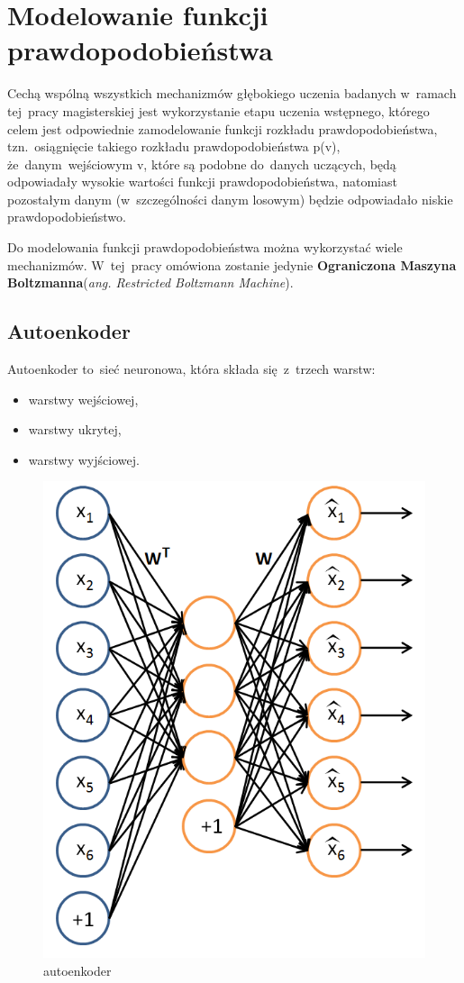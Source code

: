 \section{Modelowanie funkcji prawdopodobieństwa}
Cechą wspólną wszystkich mechanizmów głębokiego uczenia badanych w~ramach tej~pracy magisterskiej jest
wykorzystanie etapu uczenia wstępnego, którego celem jest odpowiednie zamodelowanie
funkcji rozkładu prawdopodobieństwa, tzn.~osiągnięcie takiego rozkładu prawdopodobieństwa p(v),
że~danym~wejściowym v, które są podobne do~danych uczących, będą odpowiadały wysokie wartości
funkcji prawdopodobieństwa, natomiast pozostałym danym (w~szczególności danym losowym) będzie odpowiadało
niskie prawdopodobieństwo.

Do modelowania funkcji prawdopodobieństwa można wykorzystać wiele mechanizmów. W~tej~pracy omówiona zostanie
jedynie \textbf{Ograniczona Maszyna Boltzmanna}(\textit{ang. Restricted Boltzmann
Machine}).

\subsection{Autoenkoder}
Autoenkoder \cite{Autoencoder} to~sieć neuronowa, która składa się~z~trzech warstw:
\begin{itemize}
	\item warstwy wejściowej,
	\item warstwy ukrytej,
	\item warstwy wyjściowej.
\end{itemize}

\begin{figure}[H]
	\centering
	\includegraphics[width=0.5\linewidth]{img/autoencoder.png}
	\caption{autoenkoder}
\end{figure}

